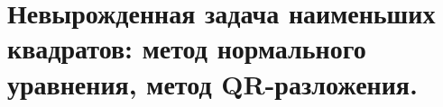 \section{Невырожденная задача наименьших квадратов: метод нормального уравнения, метод QR-разложения.}
